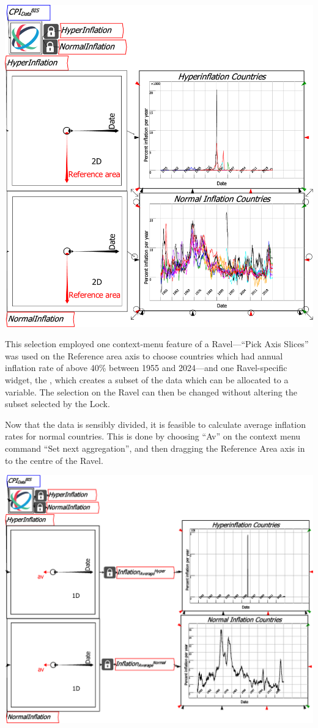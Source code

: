 \includegraphics[width=15cm]{images/RavelDataLockedSubsets}

This selection employed one context-menu feature of a Ravel---``Pick
Axis Slices'' was used on the Reference area axis to choose countries
which had annual inflation rate of above 40\% between 1955 and 2024---and
one Ravel-specific widget, the , which creates a
subset of the data which can be allocated to a variable. The selection
on the Ravel can then be changed without altering the subset selected
by the Lock.

Now that the data is sensibly divided, it is feasible to calculate
average inflation rates for normal countries. This is done by choosing
``Av'' on the context menu command ``Set next aggregation'', and
then dragging the Reference Area axis in to the centre of the Ravel.

\includegraphics[width=15cm]{images/CPI_SubsetsAverages}

